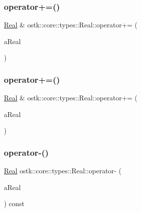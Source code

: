 \mbox{\label{classostk_1_1core_1_1types_1_1_real_afaef3ea6c884f449715e8af67ca2e599}} 
\subsubsection{\texorpdfstring{operator+=()}{operator+=()}\hspace{0.1cm}{\footnotesize\ttfamily [1/2]}}
{\footnotesize\ttfamily \hyperlink{classostk_1_1core_1_1types_1_1_real}{Real} \& ostk\+::core\+::types\+::\+Real\+::operator+= (\begin{DoxyParamCaption}\item[{const \hyperlink{classostk_1_1core_1_1types_1_1_real}{Real} \&}]{a\+Real }\end{DoxyParamCaption})}

\mbox{\label{classostk_1_1core_1_1types_1_1_real_a62dd98b444f922a5195bcb647b74700a}} 
\subsubsection{\texorpdfstring{operator+=()}{operator+=()}\hspace{0.1cm}{\footnotesize\ttfamily [2/2]}}
{\footnotesize\ttfamily \hyperlink{classostk_1_1core_1_1types_1_1_real}{Real} \& ostk\+::core\+::types\+::\+Real\+::operator+= (\begin{DoxyParamCaption}\item[{const \hyperlink{classostk_1_1core_1_1types_1_1_real_aa26f796c30b514c98d573f82e3b02296}{Real\+::\+Value\+Type} \&}]{a\+Real }\end{DoxyParamCaption})}

\mbox{\label{classostk_1_1core_1_1types_1_1_real_a35bdaf3d85b9584953efe51cdc83200b}} 
\subsubsection{\texorpdfstring{operator-\/()}{operator-()}\hspace{0.1cm}{\footnotesize\ttfamily [1/4]}}
{\footnotesize\ttfamily \hyperlink{classostk_1_1core_1_1types_1_1_real}{Real} ostk\+::core\+::types\+::\+Real\+::operator-\/ (\begin{DoxyParamCaption}\item[{const \hyperlink{classostk_1_1core_1_1types_1_1_real}{Real} \&}]{a\+Real }\end{DoxyParamCaption}) const}

